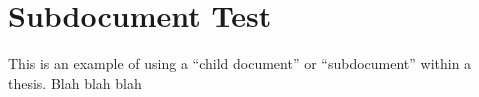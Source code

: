 \chapter{Subdocument Test}

This is an example of using a ``child document'' or ``subdocument'' within a thesis. Blah blah blah
